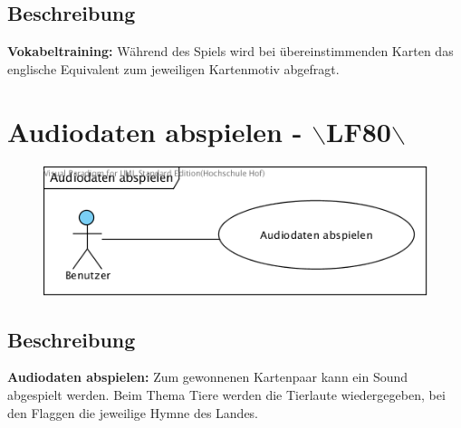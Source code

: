 \subsection{Beschreibung}
\textbf{Vokabeltraining: } Während des Spiels wird bei übereinstimmenden Karten das englische Equivalent zum jeweiligen Kartenmotiv abgefragt.


\section{Audiodaten abspielen - $\backslash$LF80$\backslash$}
\begin{figure}[!h]
	\centering
    \includegraphics[width=\textwidth]{./Audiodaten.png}
	\label{layout_gesamt}
\end{figure}

\subsection{Beschreibung}
\textbf{Audiodaten abspielen: } Zum gewonnenen Kartenpaar kann ein Sound abgespielt werden. Beim Thema Tiere werden die Tierlaute wiedergegeben, bei den Flaggen die jeweilige Hymne des Landes.

